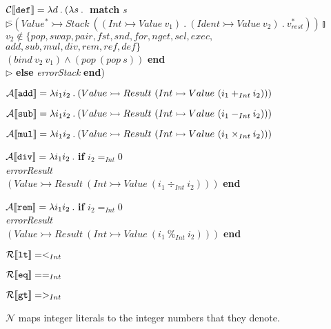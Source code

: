 \documentclass[12pt]{report}
\begin{document}
\begin{tabbing}
$\mathcal{C}\llbracket {\tt def}\rrbracket=\lambda d \:.\: (\lambda s \:.\: $ \={\bf match} {\em s} \\
\>$\triangleright $\=$(Value^*\rightarrowtail Stack\ ((Int \rightarrowtail Value\ v_1)\:.\:(Ident\rightarrowtail Value\ v_2)\:.\:v^*_{rest}))\talloblong$ \\
 $v_2\not\in \{pop, swap, pair, fst, snd, for, nget, sel, exec, $ \\ 
\>\>$add, sub, mul, div, rem, ref, def\} $ \\
 $(bind\ v_2\ v_1) \wedge (pop\ (pop\ s)) $ {\bf end} \\
\>$\triangleright$ {\bf else} {\em errorStack} {\bf end})
\end{tabbing}

$\mathcal{A}\llbracket {\tt add}\rrbracket=\lambda i_1i_2\:.\:(Value\rightarrowtail Result\ (Int\rightarrowtail Value\ (i_1+_{Int}i_2)))$

$\mathcal{A}\llbracket {\tt sub}\rrbracket=\lambda i_1i_2\:.\:(Value\rightarrowtail Result\ (Int\rightarrowtail Value\ (i_1-_{Int}i_2)))$

$\mathcal{A}\llbracket {\tt mul}\rrbracket=\lambda i_1i_2\:.\:(Value\rightarrowtail Result\ (Int\rightarrowtail Value\ (i_1\times_{Int}i_2)))$

\begin{tabbing}
$\mathcal{A}\llbracket {\tt div}\rrbracket=\lambda i_1i_2\:.\:$\={\bf if} $i_2=_{Int}0$\\
 {\em errorResult} \\
\>$(Value\rightarrowtail Result\ (Int\rightarrowtail Value\ (i_1\div_{Int}i_2)))$ {\bf end}
\end{tabbing}

\begin{tabbing}
$\mathcal{A}\llbracket {\tt rem}\rrbracket=\lambda i_1i_2\:.\:$\={\bf if} $i_2=_{Int}0$\\
 {\em errorResult} \\
\>$(Value\rightarrowtail Result\ (Int\rightarrowtail Value\ (i_1\:\%_{Int}\:i_2)))$ {\bf end}
\end{tabbing}

$\mathcal{R}\llbracket {\tt lt}\rrbracket=<_{Int}$

$\mathcal{R}\llbracket {\tt eq}\rrbracket==_{Int}$

$\mathcal{R}\llbracket {\tt gt}\rrbracket=>_{Int}$

$\mathcal{N}$ maps integer literals to the integer numbers that they denote.
\end{document}
